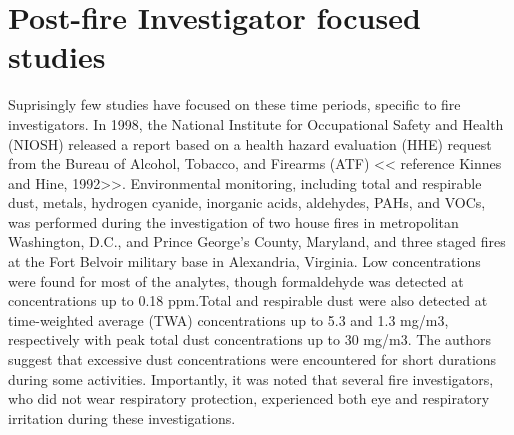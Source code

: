 \documentclass[12pt,oneside]{book}
\begin{document}
\section{Post-fire Investigator focused studies}
Suprisingly few studies have focused on these time periods, specific to fire investigators.  In 1998, the National Institute for Occupational Safety and Health (NIOSH) released a report based on a health hazard evaluation (HHE) request from the Bureau of Alcohol, Tobacco, and Firearms (ATF) << reference Kinnes and Hine, 1992>>. Environmental monitoring, including total and respirable dust, metals, hydrogen cyanide, inorganic acids, aldehydes, PAHs, and VOCs, was performed during the investigation of two house fires in metropolitan Washington, D.C., and Prince George's County, Maryland, and three staged fires at the Fort Belvoir military base in Alexandria, Virginia. Low concentrations were found for most of the analytes, though formaldehyde was detected at concentrations up to 0.18 ppm.Total and respirable dust were also detected at time-weighted average (TWA) concentrations up to 5.3 and 1.3 mg/m3, respectively with peak total dust concentrations up to 30 mg/m3. The authors suggest that excessive dust concentrations were encountered for short durations during some activities. Importantly, it was noted that several fire investigators, who did not wear respiratory protection, experienced both eye and respiratory irritation during these investigations. 
\end{document}
